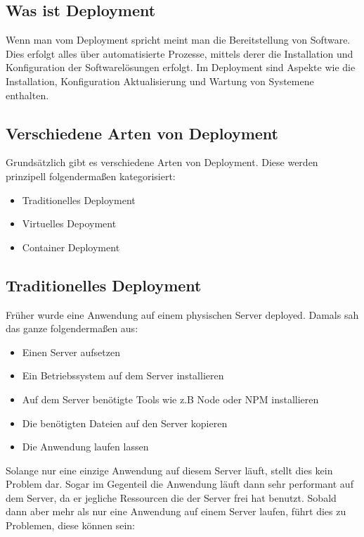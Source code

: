 \subsection{Was ist Deployment}

Wenn man vom Deployment spricht meint man die Bereitstellung von Software. Dies erfolgt alles über automatisierte Prozesse, mittels derer die Installation und Konfiguration der Softwarelösungen erfolgt. Im Deployment sind Aspekte wie die Installation, Konfiguration Aktualisierung und Wartung von Systemene enthalten.
\cite{Deployment}


\subsection{Verschiedene Arten von Deployment}

Grundsätzlich gibt es verschiedene Arten von Deployment. Diese werden prinzipell folgendermaßen kategorisiert:
    \begin{itemize}
    \item Traditionelles Deployment
    \item Virtuelles Depoyment
    \item Container Deployment
    \end{itemize}

\subsection{Traditionelles Deployment}

Früher wurde eine Anwendung auf einem physischen Server deployed. Damals sah das ganze folgendermaßen aus:

\begin{itemize}
    \item Einen Server aufsetzen
    \item Ein Betriebssystem auf dem Server installieren
    \item Auf dem Server benötigte Tools wie z.B Node oder NPM installieren
    \item Die benötigten Dateien auf den Server kopieren
    \item Die Anwendung laufen lassen
\end{itemize}

Solange nur eine einzige Anwendung auf diesem Server läuft, stellt dies kein Problem dar. Sogar im Gegenteil die Anwendung läuft dann sehr performant auf dem Server, da er jegliche Ressourcen die der Server frei hat benutzt. Sobald dann aber mehr als nur eine Anwendung auf einem Server laufen, führt dies zu Problemen, diese können sein:

